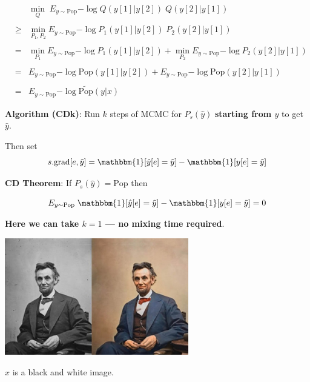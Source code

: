 {\vfill
\begin{eqnarray*}
  & & \min_Q \;E_{y\sim \mathrm{Pop}}{-\log Q(y[1]|y[2])\;Q(y[2]|y[1])} \\
  \\
  & \geq & \min_{P_1,P_2} E_{y \sim \mathrm{Pop}}{-\log P_1(y[1]|y[2])\;P_2(y[2]|y[1])} \\
  \\
  & = & \min_{P_1} E_{y \sim \mathrm{Pop}}{-\log P_1(y[1]|y[2])} + \min_{P_2} E_{y \sim \mathrm{Pop}}{-\log P_2(y[2]|y[1])} \\
  \\
  & = & E_{y \sim \mathrm{Pop}}{-\log \mathrm{Pop}(y[1]|y[2])} + E_{y \sim \mathrm{Pop}}{-\log \mathrm{Pop}(y[2]|y[1])} \\
  \\
  & = & E_{y \sim \mathrm{Pop}}{-\log \widetilde{\mathrm{Pop}}(y|x)}
\end{eqnarray*}

  
{\bf Algorithm (CDk)}: Run $k$ steps of MCMC for $P_s(\hat{y})$ {\bf starting from $y$} to get $\hat{y}$.

\vfill
Then set
$$s.\mathrm{grad}[e,\tilde{y}] = \mathbbm{1}[\hat{y}[e] = \tilde{y}] - \mathbbm{1}[y[e]= \tilde{y}]$$

\vfill
    {\bf CD Theorem}: If $P_s(\hat{y}) = \mathrm{Pop}$ then
    
    $$E_{y \sim \mathrm{Pop}}\; \mathbbm{1}[\hat{y}[e] = \tilde{y}] - \mathbbm{1}[y[e]= \tilde{y}] = 0$$

\vfill
{\bf Here we can take $k=1$ --- \bf no mixing time required}.



}

 



\centerline{\includegraphics[height = 2in]{../images/colorization}}

$x$ is a black and white image.

